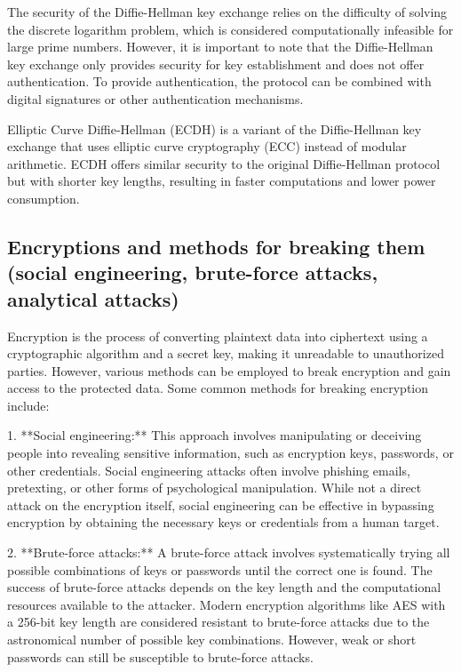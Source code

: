 \documentclass{article}
\begin{document}
The security of the Diffie-Hellman key exchange relies on the difficulty of solving the discrete logarithm problem, which is considered computationally infeasible for large prime numbers. However, it is important to note that the Diffie-Hellman key exchange only provides security for key establishment and does not offer authentication. To provide authentication, the protocol can be combined with digital signatures or other authentication mechanisms.

Elliptic Curve Diffie-Hellman (ECDH) is a variant of the Diffie-Hellman key exchange that uses elliptic curve cryptography (ECC) instead of modular arithmetic. ECDH offers similar security to the original Diffie-Hellman protocol but with shorter key lengths, resulting in faster computations and lower power consumption.


\subsection{Encryptions and methods for breaking them (social engineering, brute-force attacks, analytical attacks)}

Encryption is the process of converting plaintext data into ciphertext using a cryptographic algorithm and a secret key, making it unreadable to unauthorized parties. However, various methods can be employed to break encryption and gain access to the protected data. Some common methods for breaking encryption include:

1. **Social engineering:** This approach involves manipulating or deceiving people into revealing sensitive information, such as encryption keys, passwords, or other credentials. Social engineering attacks often involve phishing emails, pretexting, or other forms of psychological manipulation. While not a direct attack on the encryption itself, social engineering can be effective in bypassing encryption by obtaining the necessary keys or credentials from a human target.

2. **Brute-force attacks:** A brute-force attack involves systematically trying all possible combinations of keys or passwords until the correct one is found. The success of brute-force attacks depends on the key length and the computational resources available to the attacker. Modern encryption algorithms like AES with a 256-bit key length are considered resistant to brute-force attacks due to the astronomical number of possible key combinations. However, weak or short passwords can still be susceptible to brute-force attacks.
\end{document}
